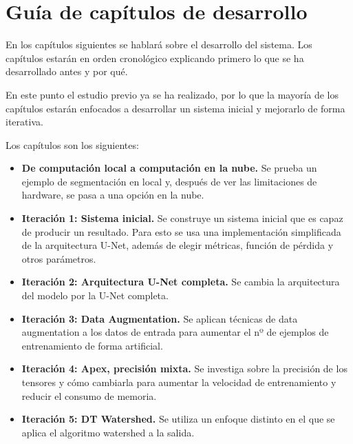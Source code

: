 \chapter{Gu\'ia de cap\'itulos de desarrollo}\label{guiacapitulos}

En los capítulos siguientes se hablará sobre el desarrollo del sistema. Los capítulos estarán en orden cronológico explicando primero lo que se ha desarrollado antes y por qué.

En este punto el estudio previo ya se ha realizado, por lo que la mayoría de los capítulos estarán enfocados a desarrollar un sistema inicial y mejorarlo de forma iterativa. 

Los capítulos son los siguientes:

\begin{itemize}
\item \textbf{De computación local a computación en la nube.} Se prueba un ejemplo de segmentación en local y, después de ver las limitaciones de hardware, se pasa a una opción en la nube.
\item \textbf{Iteración 1: Sistema inicial.} Se construye un sistema inicial que es capaz de producir un resultado. Para esto se usa una implementación simplificada de la arquitectura U-Net, además de elegir métricas, función de pérdida y otros parámetros.
\item \textbf{Iteración 2: Arquitectura U-Net completa.} Se cambia la arquitectura del modelo por la U-Net completa.
\item \textbf{Iteración 3: Data Augmentation.} Se aplican técnicas de data augmentation a los datos de entrada para aumentar el nº de ejemplos de entrenamiento de forma artificial.
\item \textbf{Iteración 4: Apex, precisión mixta.} Se investiga sobre la precisión de los tensores y cómo cambiarla para aumentar la velocidad de entrenamiento y reducir el consumo de memoria.
\item \textbf{Iteración 5: DT Watershed.} Se utiliza un enfoque distinto en el que se aplica el algoritmo watershed a la salida.
\end{itemize}